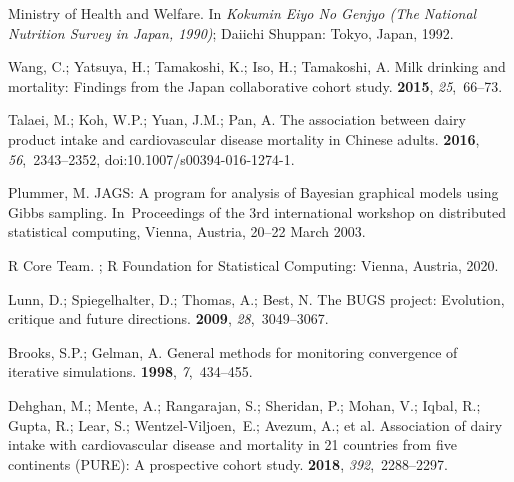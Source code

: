 \documentclass[nutrients,article,accept,moreauthors,pdftex]{Definitions/mdpi}
\begin{document}
\begin{thebibliography}{999}
{Ministry of Health and Welfare}.
\newblock In {\em Kokumin Eiyo No Genjyo (The National Nutrition Survey in Japan,
  1990)}; Daiichi Shuppan: Tokyo, Japan, 1992.

Wang, C.; Yatsuya, H.; Tamakoshi, K.; Iso, H.; Tamakoshi, A.
\newblock Milk drinking and mortality: Findings from the {Japan} collaborative
  cohort study.
 {\bf 2015}, {\em 25},~66--73.

Talaei, M.; Koh, W.P.; Yuan, J.M.; Pan, A.
\newblock The association between dairy product intake and cardiovascular
  disease mortality in Chinese adults.
 {\bf 2016}, {\em 56},~2343--2352, doi:10.1007/s00394-016-1274-1.

Plummer, M.
\newblock JAGS: A program for analysis of Bayesian graphical models using Gibbs
  sampling. In~Proceedings of the 3rd international workshop on distributed statistical computing, Vienna, Austria, 20--22 March 2003.

{R Core Team}.
;
\newblock R Foundation for Statistical Computing: Vienna, Austria,  2020.

Lunn, D.; Spiegelhalter, D.; Thomas, A.; Best, N.
\newblock The BUGS project: Evolution, critique and future directions.
 {\bf 2009}, {\em 28},~3049--3067.

Brooks, S.P.; Gelman, A.
\newblock General methods for monitoring convergence of iterative simulations.
 {\bf 1998},
  {\em 7},~434--455.

Dehghan, M.; Mente, A.; Rangarajan, S.; Sheridan, P.; Mohan, V.; Iqbal, R.;
  Gupta, R.; Lear, S.; Wentzel-Viljoen,~E.; Avezum, A.; et al.
\newblock Association of dairy intake with cardiovascular disease and mortality
  in 21 countries from five continents (PURE): A prospective cohort study.
 {\bf 2018}, {\em 392},~2288--2297.


\end{thebibliography}
\end{document}
